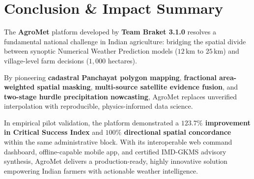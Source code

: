 \documentclass[11pt,a4paper,oneside]{report}
\begin{document}
\chapter{Conclusion \& Impact Summary}

The \textbf{AgroMet} platform developed by \textbf{Team Braket 3.1.0} resolves a fundamental national challenge in Indian agriculture: bridging the spatial divide between synoptic Numerical Weather Prediction models ($12\,\text{km}$ to $25\,\text{km}$) and village-level farm decisions ($1,000$ hectares).

By pioneering \textbf{cadastral Panchayat polygon mapping}, \textbf{fractional area-weighted spatial masking}, \textbf{multi-source satellite evidence fusion}, and \textbf{two-stage hurdle precipitation nowcasting}, AgroMet replaces unverified interpolation with reproducible, physics-informed data science. 

In empirical pilot validation, the platform demonstrated a \textbf{$123.7\%$ improvement in Critical Success Index} and \textbf{$100\%$ directional spatial concordance} within the same administrative block. With its interoperable web command dashboard, offline-capable mobile app, and certified IMD-GKMS advisory synthesis, AgroMet delivers a production-ready, highly innovative solution empowering Indian farmers with actionable weather intelligence.
\end{document}
